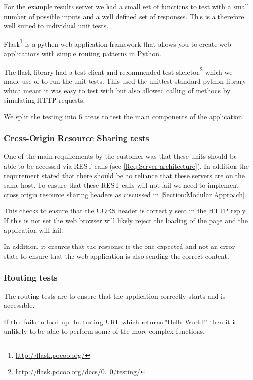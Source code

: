 For the example results server we had a small set of functions to test with a small number of possible inputs and a well defined set of responses. This is a therefore well suited to individual unit tests.

Flask\footnote{\url{http://flask.pocoo.org/}} is a python web application framework that allows you to create web applications with simple routing patterns in Python.

The flask library had a test client and recommended test skeleton\footnote{\url{http://flask.pocoo.org/docs/0.10/testing/}} which we made use of to run the unit tests. This used the unittest standard python library which meant it was easy to test with but also allowed calling of methods by simulating HTTP requests.

We split the testing into 6 areas to test the main components of the application.

\subsubsection{Cross-Origin Resource Sharing tests}

One of the main requirements by the customer was that these units should be able to be accessed via REST calls (see \cref{Req:Server architecture}). In addition the requirement stated that there should be no reliance that these servers are on the same host. To ensure that these REST calls will not fail we need to implement cross origin resource sharing headers as discussed in \autoref{Section:Modular Approach}.

This checks to ensure that the CORS header is correctly sent in the HTTP reply. If this is not set the web browser will likely reject the loading of the page and the application will fail.

In addition, it ensures that the response is the one expected and not an error state to ensure that the web application is also sending the correct content.

\subsubsection{Routing tests}

The routing tests are to ensure that the application correctly starts and is accessible.

If this fails to load up the testing URL which returns "Hello World!" then it is unlikely to be able to perform some of the more complex functions.

